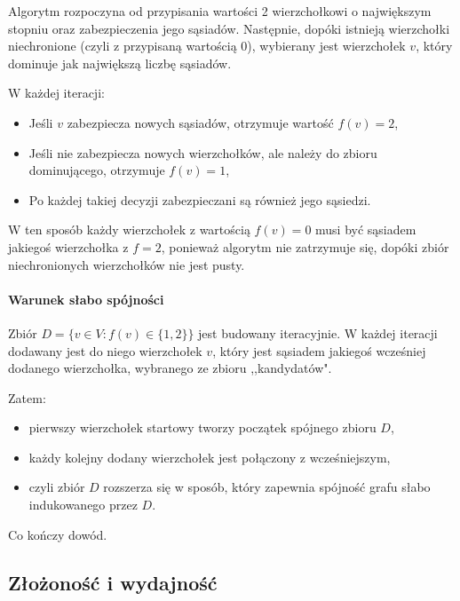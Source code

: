     Algorytm rozpoczyna od przypisania wartości 2 wierzchołkowi o największym stopniu oraz zabezpieczenia jego sąsiadów. Następnie, dopóki istnieją wierzchołki niechronione (czyli z przypisaną wartością 0), wybierany jest wierzchołek $v$, który dominuje jak największą liczbę sąsiadów.

    W każdej iteracji:
    \begin{itemize}
        \item Jeśli $v$ zabezpiecza nowych sąsiadów, otrzymuje wartość $f(v) = 2$,
        \item Jeśli nie zabezpiecza nowych wierzchołków, ale należy do zbioru dominującego, otrzymuje $f(v) = 1$,
        \item Po każdej takiej decyzji zabezpieczani są również jego sąsiedzi.
    \end{itemize}

    W ten sposób każdy wierzchołek z wartością $f(v) = 0$ musi być sąsiadem jakiegoś wierzchołka z $f = 2$, ponieważ algorytm nie zatrzymuje się, dopóki zbiór niechronionych wierzchołków nie jest pusty.

    \paragraph{Warunek słabo spójności}

    Zbiór $D = \{v \in V : f(v) \in \{1,2\} \}$ jest budowany iteracyjnie. W każdej iteracji dodawany jest do niego wierzchołek $v$, który jest sąsiadem jakiegoś wcześniej dodanego wierzchołka, wybranego ze zbioru ,,kandydatów".

    Zatem:
    \begin{itemize}
        \item pierwszy wierzchołek startowy tworzy początek spójnego zbioru $D$,
        \item każdy kolejny dodany wierzchołek jest połączony z wcześniejszym,
        \item czyli zbiór $D$ rozszerza się w sposób, który zapewnia spójność grafu słabo indukowanego przez $D$.
    \end{itemize}
    Co kończy dowód.

    
    \subsection{Złożoność i wydajność}

